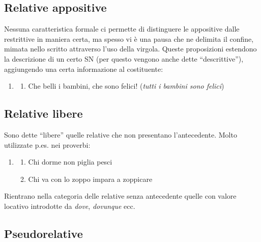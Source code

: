 \documentclass[
  a4paper,
  twoside,
  11pt,
  chapterprefix=false,
  bibliography=totocnumbered,
  listof=flat]{scrbook}
\providecommand{\tightlist}{%
  \setlength{\itemsep}{0pt}\setlength{\parskip}{0pt}}
\begin{document}
\hypertarget{relative-appositive}{%
\subsection{Relative appositive}\label{relative-appositive}}

Nessuna caratteristica formale ci permette di distinguere le appositive dalle restrittive in maniera certa, ma spesso vi è una pausa che ne delimita il confine, mimata nello scritto attraverso l'uso della virgola.
Queste proposizioni estendono la descrizione di un certo SN (per questo vengono anche dette \enquote{descrittive}), aggiungendo una certa informazione al costituente:

\begin{enumerate}
\def\labelenumi{(\arabic{enumi})}
\setcounter{enumi}{125}
\item
  \begin{enumerate}
  \def\labelenumii{\alph{enumii}.}
  \tightlist
  \item
    Che belli i bambini, che sono felici! (\emph{tutti i bambini sono felici})
  \end{enumerate}
\end{enumerate}

\hypertarget{relative-libere}{%
\subsection{Relative libere}\label{relative-libere}}

Sono dette \enquote{libere} quelle relative che non presentano l'antecedente. Molto utilizzate p.es. nei proverbi:

\begin{enumerate}
\def\labelenumi{(\arabic{enumi})}
\setcounter{enumi}{126}
\item
  \begin{enumerate}
  \def\labelenumii{\alph{enumii}.}
  \tightlist
  \item
    Chi dorme non piglia pesci
  \item
    Chi va con lo zoppo impara a zoppicare
  \end{enumerate}
\end{enumerate}

Rientrano nella categoria delle relative senza antecedente quelle con valore locativo introdotte da \emph{dove}, \emph{dovunque} ecc.

\hypertarget{pseudorelative}{%
\subsection{Pseudorelative}\label{pseudorelative}}
\end{document}
